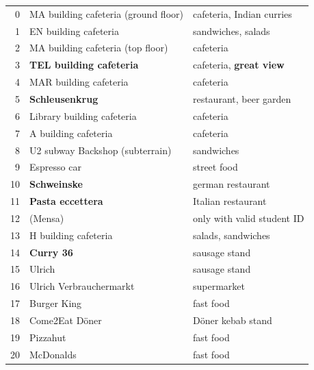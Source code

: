 \begin{multicols}{2}[]
    \begin{tabular}{rll}
        0 & MA building cafeteria (ground floor) & cafeteria, Indian curries\\
        1 & EN building cafeteria & sandwiches, salads\\
        2 & MA building cafeteria (top floor) & cafeteria\\
        3 & \bf TEL building cafeteria & cafeteria, \bf great view \\
        4 & MAR building cafeteria & cafeteria \\
        5 & \bf Schleusenkrug & restaurant, beer garden \\ 
        6 & Library building cafeteria & cafeteria\\
        7 & A building cafeteria & cafeteria\\
        8 & U2 subway Backshop (subterrain) & sandwiches\\
        9 & Espresso car & street food\\
        10 & \bf Schweinske & german restaurant\\ 
        11 & \bf  Pasta eccettera & Italian restaurant\\ 
        12 & (Mensa) & only with valid student ID\\
        13 & H building cafeteria & salads, sandwiches\\
        14 & \bf Curry 36 & sausage stand\\
        15 & Ulrich & sausage stand\\
        16 & Ulrich Verbrauchermarkt& supermarket\\
        17 & Burger King& fast food\\
        18 & Come2Eat D\"oner & D\"oner kebab stand\\
        19 & Pizzahut & fast food\\
        20 & McDonalds & fast food\\
    \end{tabular}
    

\end{multicols}
